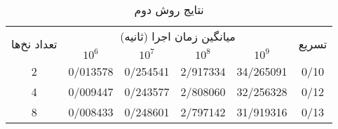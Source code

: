 \documentclass{HW}
\begin{document}
\begin{table}[ht]
\caption{نتایج روش دوم}
\begin{center}
\begin{tabular}{|c|c|c|c|c|c|}
    \hline
    \multirow{2}{*}{تعداد نخ‌ها} & \multicolumn{4}{|c|}{میانگین زمان اجرا (ثانیه)}& \multirow{2}{*}{تسریع} \\
    \cline{2-5}
& $10^6$ & $10^7$ & $10^8$ & $10^9$ & \\
    \hline
  2 & 0/013578 & 0/254541 & 2/917334 & 34/265091 & 0/10 \\ \hline
  4 & 0/009447 & 0/243577 & 2/808060 & 32/256328 & 0/12 \\ \hline
  8 & 0/008433 & 0/248601 & 2/797142 & 31/919316 & 0/13 \\ \hline
\end{tabular}
\end{center}
\label{tab:m2}
\end{table}


%
\end{document}
